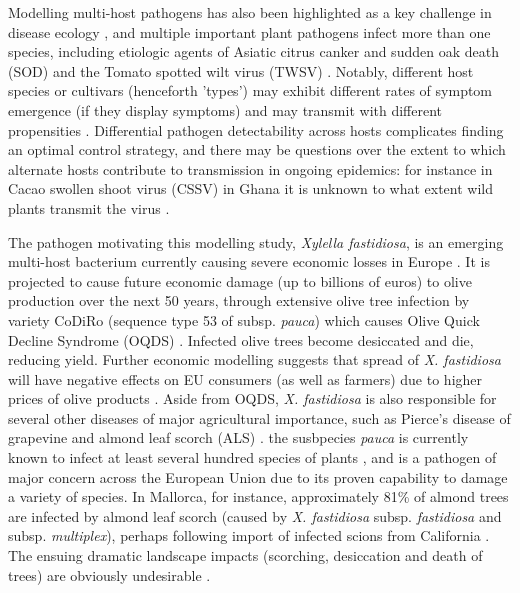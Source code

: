 \documentclass[11pt,letterpaper]{article}
\begin{document}
Modelling multi-host pathogens has also been highlighted as a key challenge in disease ecology \cite{Buhnerkempe2015}, and multiple important plant pathogens infect more than one species, including etiologic agents of Asiatic citrus canker \cite{Pruvost2022} and sudden oak death (SOD) \cite{Grunwald2008} and the Tomato spotted wilt virus (TWSV) \cite{Parrella2003}. Notably, different host species or cultivars (henceforth 'types') may exhibit different rates of symptom emergence (if they display symptoms) and may transmit with different propensities \cite{Bragard2019, NdeffoMbah2010}. Differential pathogen detectability across hosts complicates finding an optimal control strategy, and there may be questions over the extent to which alternate hosts contribute to transmission in ongoing epidemics: for instance in Cacao swollen shoot virus (CSSV) in Ghana it is unknown to what extent wild plants transmit the virus \cite{Ameyaw2024}.

The pathogen motivating this modelling study, \emph{Xylella fastidiosa}, is an emerging multi-host bacterium currently causing severe economic losses in Europe \cite{Bodino2021,Martelli2016}. It is projected to cause future economic damage (up to billions of euros) to olive production over the next 50 years, through extensive olive tree infection by variety CoDiRo (sequence type 53 of subsp. \emph{pauca}) which causes Olive Quick Decline Syndrome (OQDS) \cite{Marcelletti2016,Schneider2020}. Infected olive trees become desiccated and die, reducing yield. Further economic modelling suggests that spread of \emph{X. fastidiosa}  will have negative effects on EU consumers (as well as farmers) due to higher prices of olive products \cite{Schneider2021}. Aside from OQDS, \emph{X. fastidiosa} is also responsible for several other diseases of major agricultural importance, such as Pierce's disease of grapevine \cite{GimenezRomero2024} and almond leaf scorch (ALS) \cite{Gibin2023}. the susbpecies \emph{pauca} is currently known to infect at least several hundred species of plants \cite{Gibin2023}, and is a pathogen of major concern across the European Union due to its proven capability to damage a variety of species. In Mallorca, for instance, approximately 81\% of almond trees are infected by almond leaf scorch (caused by \emph{X. fastidiosa} subsp. \emph{fastidiosa} and subsp. \emph{multiplex}), perhaps following import of infected scions from California \cite{Olmo2021}. The ensuing dramatic landscape impacts (scorching, desiccation and death of trees) are obviously undesirable \cite{GimenezRomero2023}. 
\end{document}
